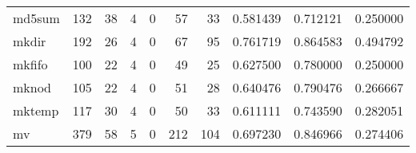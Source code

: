 \begin{longtable}{lrrrrrrrrr}
md5sum    &                                                132 &                                                 38 &                                                  4 &                                                  0 &                                                 57 &                                                 33 &                                           0.581439 &                               0.712121 &                             0.250000 \\
mkdir     &                                                192 &                                                 26 &                                                  4 &                                                  0 &                                                 67 &                                                 95 &                                           0.761719 &                               0.864583 &                             0.494792 \\
mkfifo    &                                                100 &                                                 22 &                                                  4 &                                                  0 &                                                 49 &                                                 25 &                                           0.627500 &                               0.780000 &                             0.250000 \\
mknod     &                                                105 &                                                 22 &                                                  4 &                                                  0 &                                                 51 &                                                 28 &                                           0.640476 &                               0.790476 &                             0.266667 \\
mktemp    &                                                117 &                                                 30 &                                                  4 &                                                  0 &                                                 50 &                                                 33 &                                           0.611111 &                               0.743590 &                             0.282051 \\
mv        &                                                379 &                                                 58 &                                                  5 &                                                  0 &                                                212 &                                                104 &                                           0.697230 &                               0.846966 &                             0.274406 \\

\end{longtable}
